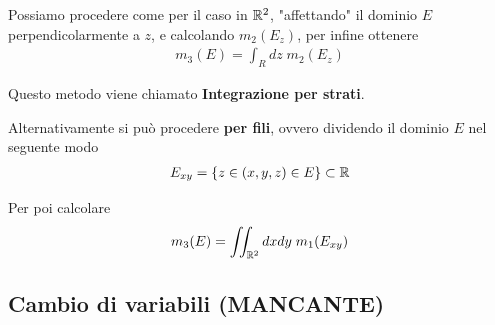 Possiamo procedere come per il caso in $\mathbb{R}^2$, "affettando" il dominio $E$ perpendicolarmente a $z$, e calcolando $m_2(E_z)$, per infine ottenere
\begin{align}
	m_3(E)= \int_{R} dz \; m_2(E_z)
\end{align}

Questo metodo viene chiamato \textbf{Integrazione per strati}.

\begin{figure}[!htb]
\end{figure}

Alternativamente si può procedere \textbf{per fili}, ovvero dividendo il dominio $E$ nel seguente modo
\begin{align}
	E_{xy} = \{ z \in (x,y,z)\in E \}\subset \mathbb{R}  
\end{align}

Per poi calcolare
\begin{align}
	m_3(E)= \iint_{\mathbb{R}^2} dxdy \; m_1(E_{xy})
\end{align}

\begin{figure}[!htb]
\end{figure}

\subsection{Cambio di variabili (MANCANTE)}

